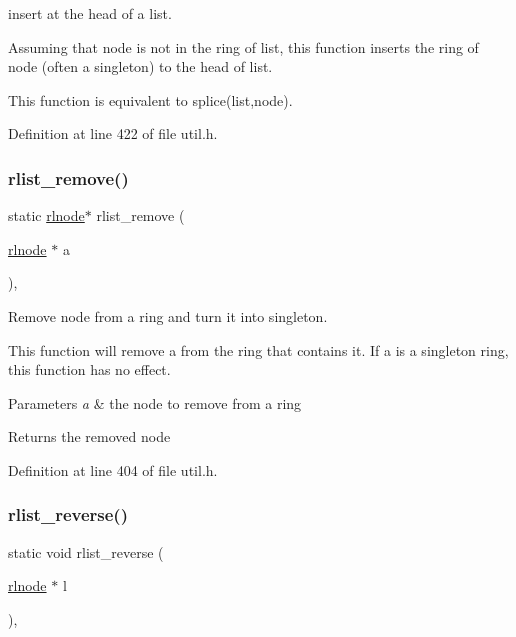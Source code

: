 insert at the head of a list. 

Assuming that {\ttfamily node} is not in the ring of {\ttfamily list}, this function inserts the ring of {\ttfamily node} (often a singleton) to the head of {\ttfamily list}.

This function is equivalent to {\ttfamily splice(list,node)}. 

Definition at line 422 of file util.\+h.

\mbox{\label{group__rlists_ga9177b286dcefd1d853aae220a98d3c7b}} 
\subsubsection{\texorpdfstring{rlist\+\_\+remove()}{rlist\_remove()}}
{\footnotesize\ttfamily static \hyperlink{group__rlists_ga8f6244877f7ce2322c90525217ea6e7a}{rlnode}$\ast$ rlist\+\_\+remove (\begin{DoxyParamCaption}\item[{\hyperlink{group__rlists_ga8f6244877f7ce2322c90525217ea6e7a}{rlnode} $\ast$}]{a }\end{DoxyParamCaption})\hspace{0.3cm}{\ttfamily [inline]}, {\ttfamily [static]}}



Remove node from a ring and turn it into singleton. 

This function will remove {\ttfamily a} from the ring that contains it. If {\ttfamily a} is a singleton ring, this function has no effect. 
\begin{DoxyParams}{Parameters}
{\em a} & the node to remove from a ring \\
\hline
\end{DoxyParams}
\begin{DoxyReturn}{Returns}
the removed node 
\end{DoxyReturn}


Definition at line 404 of file util.\+h.

\mbox{\label{group__rlists_ga3911836f21f2f50b4caa2fa1d8e1f1de}} 
\subsubsection{\texorpdfstring{rlist\+\_\+reverse()}{rlist\_reverse()}}
{\footnotesize\ttfamily static void rlist\+\_\+reverse (\begin{DoxyParamCaption}\item[{\hyperlink{group__rlists_ga8f6244877f7ce2322c90525217ea6e7a}{rlnode} $\ast$}]{l }\end{DoxyParamCaption})\hspace{0.3cm}{\ttfamily [inline]}, {\ttfamily [static]}}



